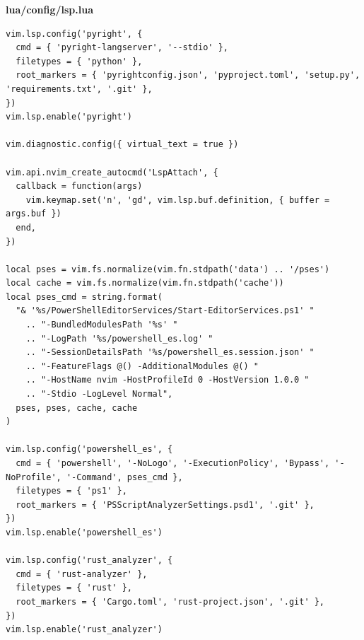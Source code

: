 \textbf{lua/config/lsp.lua}
\begin{lstlisting}
vim.lsp.config('pyright', {
  cmd = { 'pyright-langserver', '--stdio' },
  filetypes = { 'python' },
  root_markers = { 'pyrightconfig.json', 'pyproject.toml', 'setup.py', 'requirements.txt', '.git' },
})
vim.lsp.enable('pyright')

vim.diagnostic.config({ virtual_text = true })

vim.api.nvim_create_autocmd('LspAttach', {
  callback = function(args)
    vim.keymap.set('n', 'gd', vim.lsp.buf.definition, { buffer = args.buf })
  end,
})

local pses = vim.fs.normalize(vim.fn.stdpath('data') .. '/pses')
local cache = vim.fs.normalize(vim.fn.stdpath('cache'))
local pses_cmd = string.format(
  "& '%s/PowerShellEditorServices/Start-EditorServices.ps1' "
    .. "-BundledModulesPath '%s' "
    .. "-LogPath '%s/powershell_es.log' "
    .. "-SessionDetailsPath '%s/powershell_es.session.json' "
    .. "-FeatureFlags @() -AdditionalModules @() "
    .. "-HostName nvim -HostProfileId 0 -HostVersion 1.0.0 "
    .. "-Stdio -LogLevel Normal",
  pses, pses, cache, cache
)

vim.lsp.config('powershell_es', {
  cmd = { 'powershell', '-NoLogo', '-ExecutionPolicy', 'Bypass', '-NoProfile', '-Command', pses_cmd },
  filetypes = { 'ps1' },
  root_markers = { 'PSScriptAnalyzerSettings.psd1', '.git' },
})
vim.lsp.enable('powershell_es')

vim.lsp.config('rust_analyzer', {
  cmd = { 'rust-analyzer' },
  filetypes = { 'rust' },
  root_markers = { 'Cargo.toml', 'rust-project.json', '.git' },
})
vim.lsp.enable('rust_analyzer')
\end{lstlisting}
\narrow

